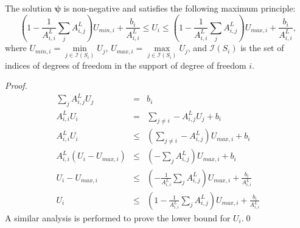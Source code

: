 \begin{theorem}
The solution $\mathbf{\psi}$ is non-negative and satisfies the following maximum principle:
\begin{equation}\label{ss_max_principle}
   \left(1 - \frac{1}{A^L_{i,i}}\sum\limits_j A^L_{i,j}\right)U_{min,i}
      + \frac{b_i}{A^L_{i,i}}\le U_i
   \le \left(1 - \frac{1}{A^L_{i,i}}\sum\limits_j A^L_{i,j}\right)U_{max,i}
      + \frac{b_i}{A^L_{i,i}},
\end{equation}
where $U_{min,i} = \min\limits_{j\in \mathcal{I}(S_i)}U_j$, $U_{max,i}
= \max\limits_{j\in \mathcal{I}(S_i)}U_j$,
and $\mathcal{I}(S_i)$ is the set of indices of degrees of freedom in the support
of degree of freedom $i$.
\end{theorem}
\begin{proof}
\begin{eqnarray*}
	\sum\limits_j A^L_{i,j}U_j & = & b_i\\
	A^L_{i,i}U_i & = & \sum\limits_{j\ne i} -A^L_{i,j}U_j + b_i\\
	A^L_{i,i}U_i & \le & \left(\sum\limits_{j\ne i} -A^L_{i,j}\right)U_{max,i} + b_i\\
	A^L_{i,i}(U_i - U_{max,i}) & \le & \left(-\sum\limits_j A^L_{i,j}\right)U_{max,i}
      + b_i\\
	U_i - U_{max,i} & \le & \left(-\frac{1}{A^L_{i,i}}\sum\limits_j A^L_{i,j}\right)
      U_{max,i} + \frac{b_i}{A^L_{i,i}}\\
	U_i & \le & \left(1 - \frac{1}{A^L_{i,i}}\sum\limits_j A^L_{i,j}\right)U_{max,i}
      + \frac{b_i}{A^L_{i,i}}
\end{eqnarray*}
A similar analysis is performed to prove the lower bound for $U_i$.\qed
\end{proof}